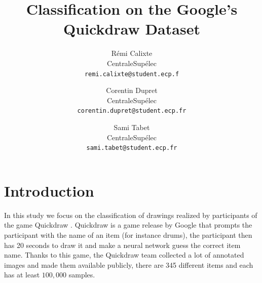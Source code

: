 \documentclass[10pt,twocolumn,letterpaper]{article}
\begin{document}
\title{Classification on the Google's Quickdraw Dataset}

\author{Rémi Calixte\\
CentraleSupélec\\
{\tt\small remi.calixte@student.ecp.f}
\and
Corentin Dupret\\
CentraleSupélec\\
{\tt\small corentin.dupret@student.ecp.fr}
\and
Sami Tabet\\
CentraleSupélec\\
{\tt\small sami.tabet@student.ecp.fr}
}

\newcommand{\rnnTitle}{Recurrent Neural Networks on the drawn strokes}
\newcommand{\cnnTitle}{Convolutional Neural Networks on 28x28 grayscale bitmaps}
\newcommand{\imgenTitle}{Transfer Learning of Convolutional Neural Networks on 64x64 and 96x96 images generated from drawn strokes}


\maketitle


\section{Introduction}

In this study we focus on the classification of drawings realized by participants of the game Quickdraw \cite{GoogleQuickdraw}. Quickdraw is a game release by Google that prompts the participant with the name of an item  (for instance drums), the participant then has 20 seconds to draw it and make a neural network guess the correct item name. Thanks to this game, the Quickdraw team collected a lot of annotated images and made them available publicly, there are 345 different items and each has at least $100,000$ samples.
\end{document}
